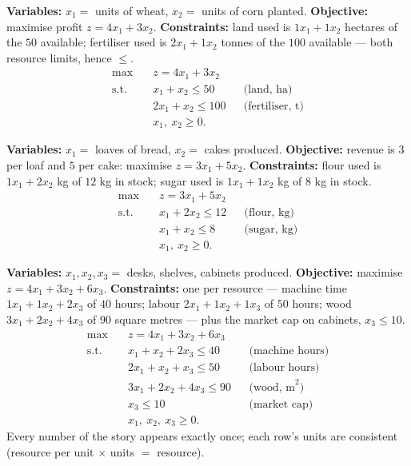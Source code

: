 \begin{solutions}
  \item \textbf{Variables:} $x_1=$ units of wheat, $x_2=$ units of corn
        planted.
        \textbf{Objective:} maximise profit $z=4x_1+3x_2$.
        \textbf{Constraints:} land used is $1x_1+1x_2$ hectares of the
        $50$ available; fertiliser used is $2x_1+1x_2$ tonnes of the
        $100$ available — both resource limits, hence $\le$.
        \[
          \begin{aligned}
            \max\quad & z=4x_1+3x_2\\
            \text{s.t.}\quad & x_1+x_2\le 50 &&\text{(land, ha)}\\
            & 2x_1+x_2\le 100 &&\text{(fertiliser, t)}\\
            & x_1,\ x_2\ge 0 .
          \end{aligned}
        \]

  \item \textbf{Variables:} $x_1=$ loaves of bread, $x_2=$ cakes
        produced.
        \textbf{Objective:} revenue is $3$ per loaf and $5$ per cake:
        maximise $z=3x_1+5x_2$.
        \textbf{Constraints:} flour used is $1x_1+2x_2$ kg of $12$ kg in
        stock; sugar used is $1x_1+1x_2$ kg of $8$ kg in stock.
        \[
          \begin{aligned}
            \max\quad & z=3x_1+5x_2\\
            \text{s.t.}\quad & x_1+2x_2\le 12 &&\text{(flour, kg)}\\
            & x_1+x_2\le 8 &&\text{(sugar, kg)}\\
            & x_1,\ x_2\ge 0 .
          \end{aligned}
        \]

  \item \textbf{Variables:} $x_1,x_2,x_3=$ desks, shelves, cabinets
        produced.
        \textbf{Objective:} maximise $z=4x_1+3x_2+6x_3$.
        \textbf{Constraints:} one per resource — machine time
        $1x_1+1x_2+2x_3$ of $40$ hours; labour $2x_1+1x_2+1x_3$ of $50$
        hours; wood $3x_1+2x_2+4x_3$ of $90$ square metres — plus the
        market cap on cabinets, $x_3\le 10$.
        \[
          \begin{aligned}
            \max\quad & z=4x_1+3x_2+6x_3\\
            \text{s.t.}\quad & x_1+x_2+2x_3\le 40 &&\text{(machine hours)}\\
            & 2x_1+x_2+x_3\le 50 &&\text{(labour hours)}\\
            & 3x_1+2x_2+4x_3\le 90 &&\text{(wood, m}^2)\\
            & x_3\le 10 &&\text{(market cap)}\\
            & x_1,\ x_2,\ x_3\ge 0 .
          \end{aligned}
        \]
        Every number of the story appears exactly once; each row's units
        are consistent (resource per unit $\times$ units $=$ resource).


\end{solutions}
